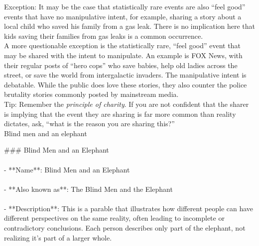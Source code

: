 \documentclass[a4paper,12pt,single,pdftex]{scrartcl}
\begin{document}
    
      Exception: It may be the case that statistically rare events are also “feel good” events that have no manipulative intent, for example, sharing a story about a local child who saved his family from a gas leak. There is no implication here that kids saving their families from gas leaks is a common occurrence.
    \\

    
      A more questionable exception is the statistically rare, “feel good” event that may be shared with the intent to manipulate. An example is FOX News, with their regular posts of “hero cops” who save babies, help old ladies across the street, or save the world from intergalactic invaders. The manipulative intent is debatable. While the public does love these stories, they also counter the police brutality stories commonly posted by mainstream media. 
    \\

    
      Tip: Remember the {\em principle of charity}. If you are not confident that the sharer is implying that the event they are sharing is far more common than reality dictates, ask, “what is the reason you are sharing this?”
    \\

  

Blind men and an elephant
    
      \#\#\# Blind Men and an Elephant
    \\

    
      
    \\

    
      - **Name**: Blind Men and an Elephant
    \\

    
      
    \\

    
      - **Also known as**: The Blind Men and the Elephant
    \\

    
      
    \\

    
      - **Description**: This is a parable that illustrates how different people can have different perspectives on the same reality, often leading to incomplete or contradictory conclusions. Each person describes only part of the elephant, not realizing it's part of a larger whole.
    \\
\end{document}
